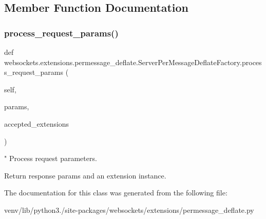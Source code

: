 \subsection{Member Function Documentation}
\mbox{\label{classwebsockets_1_1extensions_1_1permessage__deflate_1_1_server_per_message_deflate_factory_a56cff23a66fc604f79b24027eb5d16f0}} 
\subsubsection{\texorpdfstring{process\+\_\+request\+\_\+params()}{process\_request\_params()}}
{\footnotesize\ttfamily def websockets.\+extensions.\+permessage\+\_\+deflate.\+Server\+Per\+Message\+Deflate\+Factory.\+process\+\_\+request\+\_\+params (\begin{DoxyParamCaption}\item[{}]{self,  }\item[{}]{params,  }\item[{}]{accepted\+\_\+extensions }\end{DoxyParamCaption})}

\begin{DoxyVerb}"
Process request parameters.

Return response params and an extension instance.\end{DoxyVerb}
 

The documentation for this class was generated from the following file\+:\begin{DoxyCompactItemize}
\item 
venv/lib/python3./site-\/packages/websockets/extensions/permessage\+\_\+deflate.\+py\end{DoxyCompactItemize}
